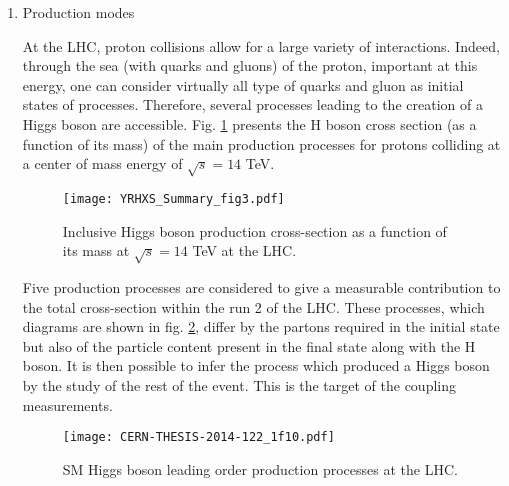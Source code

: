 \begin{enumerate}
\item Production modes
\label{sec:org52a585f}

At the LHC, proton collisions allow for a large variety of interactions.
Indeed, through the sea (with quarks and gluons) of the proton, important at this energy, one can consider virtually all type of quarks and gluon as initial states of processes.
Therefore, several processes leading to the creation of a Higgs boson are accessible.
Fig. \ref{fig:org34d1e6a} presents the H boson cross section (as a function of its mass) of  the main production processes for protons colliding at a center of mass energy of \(\sqrt{s}=14\) TeV.


\begin{figure}[htbp]
\centering
\texttt{[image: YRHXS\_Summary\_fig3.pdf]}
\caption{\label{fig:org34d1e6a}
Inclusive Higgs boson production cross-section as a function of its mass at $\sqrt{s}=14$ TeV at the LHC. \cite{CERN-2013-004}}
\end{figure}


Five production processes are considered to give a measurable contribution to the total cross-section within the run 2 of the LHC.
These processes, which diagrams are shown in fig. \ref{fig:org3ec611e}, differ by the partons required in the initial state but also of the particle content present in the final state along with the H boson.
It is then possible to infer the process which produced a Higgs  boson by the study of the rest of the event.
This is the target of the coupling measurements.


\begin{figure}[htbp]
\centering
\texttt{[image: CERN-THESIS-2014-122\_1f10.pdf]}
\caption{\label{fig:org3ec611e}
SM Higgs boson leading order production processes at the LHC. \cite{CERN-THESIS-2014-122}}
\end{figure}


\end{enumerate}
